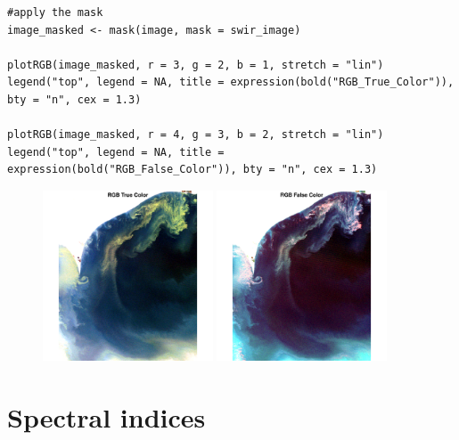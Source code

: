 \documentclass[10pt]{beamer}
\begin{document}
\begin{frame}[fragile]{}
\begin{lstlisting}[firstnumber = 29]
#apply the mask
image_masked <- mask(image, mask = swir_image) 

plotRGB(image_masked, r = 3, g = 2, b = 1, stretch = "lin")
legend("top", legend = NA, title = expression(bold("RGB_True_Color")), bty = "n", cex = 1.3)

plotRGB(image_masked, r = 4, g = 3, b = 2, stretch = "lin") 
legend("top", legend = NA, title = expression(bold("RGB_False_Color")), bty = "n", cex = 1.3)
\end{lstlisting}
 \begin{figure}
    \centering
    \includegraphics[width=0.45\textwidth]{images/masked_rgb.pdf}
    \includegraphics[width=0.45\textwidth]{images/masked_false.pdf}
\end{figure}
\end{frame}

\section{Spectral indices}
\end{document}
